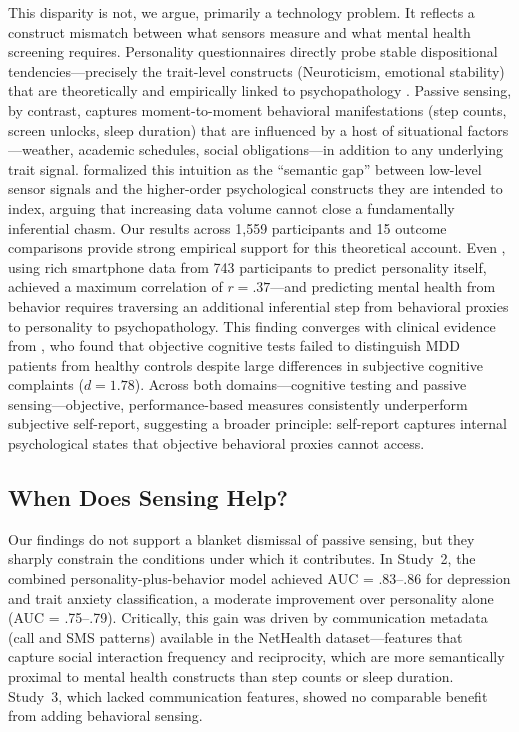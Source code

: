\documentclass[12pt, a4paper]{article}
\begin{document}
This disparity is not, we argue, primarily a technology problem. It reflects a construct mismatch between what sensors measure and what mental health screening requires. Personality questionnaires directly probe stable dispositional tendencies---precisely the trait-level constructs (Neuroticism, emotional stability) that are theoretically and empirically linked to psychopathology \citep{kotov2010linking, lahey2009public}. Passive sensing, by contrast, captures moment-to-moment behavioral manifestations (step counts, screen unlocks, sleep duration) that are influenced by a host of situational factors---weather, academic schedules, social obligations---in addition to any underlying trait signal. \citet{dasswain2022semantic} formalized this intuition as the ``semantic gap'' between low-level sensor signals and the higher-order psychological constructs they are intended to index, arguing that increasing data volume cannot close a fundamentally inferential chasm. Our results across 1,559 participants and 15 outcome comparisons provide strong empirical support for this theoretical account. Even \citet{stachl2020predicting}, using rich smartphone data from 743 participants to predict personality itself, achieved a maximum correlation of $r = .37$---and predicting mental health from behavior requires traversing an additional inferential step from behavioral proxies to personality to psychopathology. This finding converges with clinical evidence from \citet{tay2026layered}, who found that objective cognitive tests failed to distinguish MDD patients from healthy controls despite large differences in subjective cognitive complaints ($d = 1.78$). Across both domains---cognitive testing and passive sensing---objective, performance-based measures consistently underperform subjective self-report, suggesting a broader principle: self-report captures internal psychological states that objective behavioral proxies cannot access.

\subsection{When Does Sensing Help?}

Our findings do not support a blanket dismissal of passive sensing, but they sharply constrain the conditions under which it contributes. In Study~2, the combined personality-plus-behavior model achieved AUC = .83--.86 for depression and trait anxiety classification, a moderate improvement over personality alone (AUC = .75--.79). Critically, this gain was driven by communication metadata (call and SMS patterns) available in the NetHealth dataset---features that capture social interaction frequency and reciprocity, which are more semantically proximal to mental health constructs than step counts or sleep duration. Study~3, which lacked communication features, showed no comparable benefit from adding behavioral sensing.
\end{document}
